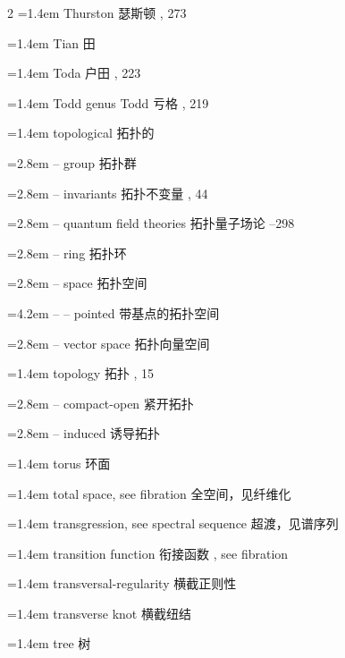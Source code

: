 \begin{multicols}{2}
\noindent\hangindent=1.4em Thurston \quad 瑟斯顿 , 273\par
\noindent\hangindent=1.4em Tian \quad 田 \par
\noindent\hangindent=1.4em Toda \quad 户田 , 223\par
\noindent\hangindent=1.4em Todd genus \quad Todd 亏格 , 219\par
\noindent\hangindent=1.4em topological \quad 拓扑的 \quad\par
\noindent\hangindent=2.8em -- group \quad 拓扑群 \par
\noindent\hangindent=2.8em -- invariants \quad 拓扑不变量 , 44\par
\noindent\hangindent=2.8em -- quantum field theories \quad 拓扑量子场论 --298\par
\noindent\hangindent=2.8em -- ring \quad 拓扑环 \par
\noindent\hangindent=2.8em -- space \quad 拓扑空间 \par
\noindent\hangindent=4.2em -- -- pointed \quad 带基点的拓扑空间 \par
\noindent\hangindent=2.8em -- vector space \quad 拓扑向量空间 \par
\noindent\hangindent=1.4em topology \quad 拓扑 , 15\par
\noindent\hangindent=2.8em -- compact-open \quad 紧开拓扑 \par
\noindent\hangindent=2.8em -- induced \quad 诱导拓扑 \par
\noindent\hangindent=1.4em torus \quad 环面 \par
\noindent\hangindent=1.4em total space, see fibration \quad 全空间，见纤维化 \quad\par
\noindent\hangindent=1.4em transgression, see spectral sequence \quad 超渡，见谱序列 \quad\par
\noindent\hangindent=1.4em transition function \quad 衔接函数 , see fibration\par
\noindent\hangindent=1.4em transversal-regularity \quad 横截正则性 \par
\noindent\hangindent=1.4em transverse knot \quad 横截纽结 \par
\noindent\hangindent=1.4em tree \quad 树 \par

\end{multicols}
